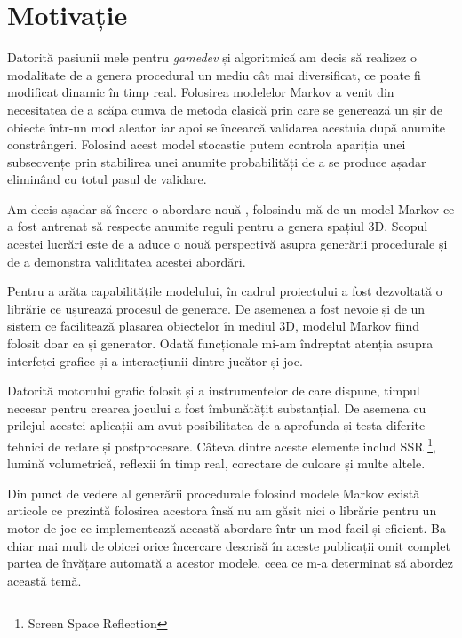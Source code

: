 \chapter*{Motivație} 

Datorită pasiunii mele pentru \textit{gamedev} și algoritmică am decis să realizez o modalitate de a genera procedural un mediu cât mai diversificat, ce poate fi modificat dinamic în timp real. Folosirea modelelor Markov a venit din necesitatea de a scăpa cumva de metoda clasică prin care se generează un șir de obiecte într-un mod aleator iar apoi se încearcă validarea acestuia după anumite constrângeri. Folosind acest model stocastic putem controla apariția unei subsecvențe prin stabilirea unei anumite probabilități de a se produce așadar eliminând cu totul pasul de validare.\par

Am decis așadar să încerc o abordare nouă , folosindu-mă de un model Markov ce a fost antrenat să respecte anumite reguli pentru a genera spațiul 3D. Scopul acestei lucrări este de a aduce o nouă perspectivă asupra generării procedurale și de a demonstra validitatea acestei abordări.\par

Pentru a arăta capabilitățile modelului, în cadrul proiectului a fost dezvoltată o librărie ce ușurează procesul de generare. De asemenea a fost nevoie și de un sistem ce facilitează plasarea obiectelor în mediul 3D, modelul Markov fiind folosit doar ca și generator. Odată funcționale mi-am îndreptat atenția asupra interfeței grafice și a interacțiunii dintre jucător și joc.\par

Datorită motorului grafic folosit și a instrumentelor de care dispune, timpul necesar pentru crearea jocului a fost îmbunătățit substanțial. De asemena cu prilejul acestei aplicații am avut posibilitatea de a aprofunda și testa diferite tehnici de redare și postprocesare. Câteva dintre aceste elemente includ SSR \footnote{Screen Space Reflection}, lumină volumetrică, reflexii în timp real, corectare de culoare și multe altele.\par

Din punct de vedere al generării procedurale folosind modele Markov există articole ce prezintă folosirea acestora însă nu am găsit nici o librărie pentru un motor de joc ce implementează această abordare într-un mod facil și eficient. Ba chiar mai mult de obicei orice încercare descrisă în aceste publicații omit complet partea de învățare automată a acestor modele, ceea ce m-a determinat să abordez această temă.\par

